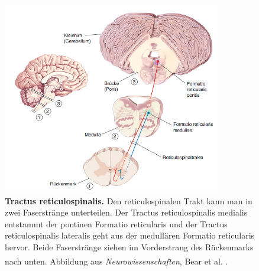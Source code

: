 \documentclass[12pt,a4paper,pdftex]{article}
\begin{document}
\begin{figure}[H]
    \centering
    \includegraphics[width=0.85\textwidth]{pictures/Bilder_Laura/reticulospinaler_tract.PNG}
    \caption[Tractus reticulospinalis]{\textbf{Tractus reticulospinalis.} Den reticulospinalen Trakt kann man in zwei Faserstränge unterteilen.  Der Tractus reticulospinalis medialis entstammt der pontinen Formatio reticularis und der Tractus reticulospinalis lateralis geht aus der medullären Formatio reticularis hervor. Beide Faserstränge ziehen im Vorderstrang des Rückenmarks nach unten. Abbildung aus \textit{Neurowissenschaften}, Bear et al. \textsuperscript{\cite[14]{neurowissenschaften_baer}}.}
    \label{fig:tr_reticulospinalis}
\end{figure}
\end{document}
